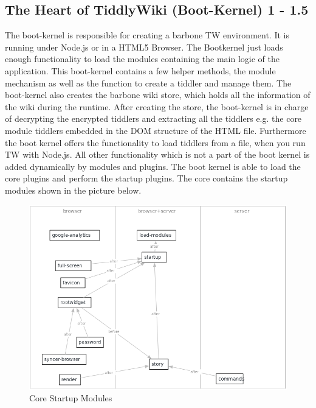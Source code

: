 \documentclass[12pt,a4paper]{article}
\begin{document}
\subsection{The Heart of TiddlyWiki (Boot-Kernel) 1 - 1.5}
The boot-kernel is responsible for creating a barbone TW environment. It is running under Node.js or in a HTML5 Browser. The Bootkernel just loads enough functionality to load the modules containing the main logic of the application. This boot-kernel contains a few helper methods, the module mechanism as well as the function to create a tiddler and manage them. The boot-kernel also creates the barbone wiki store, which holds all the information of the wiki during the runtime. After creating the store, the boot-kernel is in charge of decrypting the encrypted tiddlers and extracting all the tiddlers e.g. the core module tiddlers embedded in the DOM structure of the HTML file. Furthermore the boot kernel offers the functionality to load tiddlers from a file, when you run TW with Node.js. All other functionality which is not a part of the boot kernel is added dynamically by modules and plugins. The boot kernel is able to load the core plugins and perform the startup plugins. The core contains the startup modules shown in the picture below.
\begin{figure}[hbtp]
\caption{Core Startup Modules}
\includegraphics[scale=0.5]{images/index.png}
\end{figure}

\newpage
\end{document}
